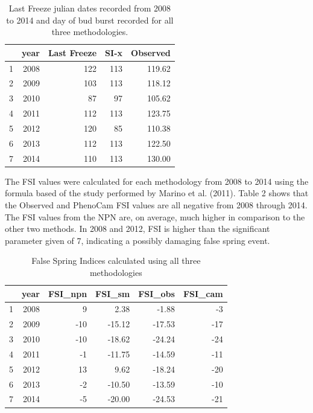 \documentclass{article}\usepackage[]{graphicx}\usepackage[]{color}
\begin{document}
\begin{table}[ht]
\centering
\caption{Last Freeze julian dates recorded from 2008 to 2014 and day of bud burst recorded for all three methodologies.} 
\begin{tabular}{rrrrr}
  \hline
 & year & Last Freeze & SI-x & Observed \\ 
  \hline
1 & 2008 & 122 & 113 & 119.62 \\ 
  2 & 2009 & 103 & 113 & 118.12 \\ 
  3 & 2010 &  87 &  97 & 105.62 \\ 
  4 & 2011 & 112 & 113 & 123.75 \\ 
  5 & 2012 & 120 &  85 & 110.38 \\ 
  6 & 2013 & 112 & 113 & 122.50 \\ 
  7 & 2014 & 110 & 113 & 130.00 \\ 
   \hline
\end{tabular}
\end{table}

The FSI values were calculated for each methodology from 2008 to 2014 using the formula based of the study performed by Marino et al. (2011). Table 2 shows that the Observed and PhenoCam FSI values are all negative from 2008 through 2014. The FSI values from the NPN are, on average, much higher in comparison to the other two methods. In 2008 and 2012, FSI is higher than the significant parameter given of 7, indicating a possibly damaging false spring event. 
\begin{table}[ht]
\centering
\caption{False Spring Indices calculated using all three methodologies} 
\begin{tabular}{rrrrrr}
  \hline
 & year & FSI\_npn & FSI\_sm & FSI\_obs & FSI\_cam \\ 
  \hline
1 & 2008 &   9 & 2.38 & -1.88 &  -3 \\ 
  2 & 2009 & -10 & -15.12 & -17.53 & -17 \\ 
  3 & 2010 & -10 & -18.62 & -24.24 & -24 \\ 
  4 & 2011 &  -1 & -11.75 & -14.59 & -11 \\ 
  5 & 2012 &  13 & 9.62 & -18.24 & -20 \\ 
  6 & 2013 &  -2 & -10.50 & -13.59 & -10 \\ 
  7 & 2014 &  -5 & -20.00 & -24.53 & -21 \\ 
   \hline
\end{tabular}
\end{table}
\end{document}
